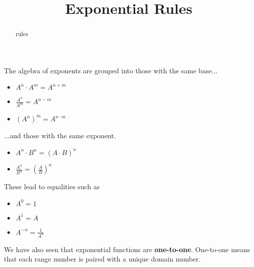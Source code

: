\documentclass{ximera}
\title{Exponential Rules}
\begin{document}
\begin{abstract}
rules
\end{abstract}
\maketitle





The algebra of exponents are grouped into those with the same base...



\begin{itemize}
\item $A^n \cdot A^m = A^{n+m}$
\item $\frac{A^n}{A^m} = A^{n-m}$
\item $(A^n)^m = A^{n \cdot m}$ \\
\end{itemize}

...and those with the same exponent. 

\begin{itemize}
\item $A^n \cdot B^n = (A \cdot B)^n$
\item $\frac{A^n}{B^n} = \left(\frac{A}{B}\right)^n$ \\
\end{itemize}




These lead to equalities such as



\begin{itemize}
\item $A^0 = 1$
\item $A^1 = A$
\item $A^{-n} = \frac{1}{A^n}$
\end{itemize}




We have also seen that exponential functions are \textbf{one-to-one}. One-to-one means that each range number is paired with a unique domain number.
\end{document}
